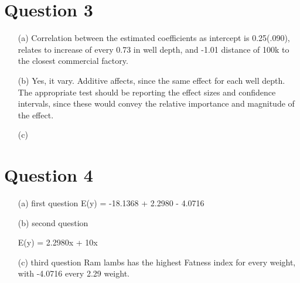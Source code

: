 \documentclass[12pt,letterpaper]{article}
\begin{document}
\section*{Question 3}
\vspace{.5cm}
\begin{enumerate}
	
	\item [(a)] Correlation between the estimated coefficients as intercept is 0.25(.090), relates to increase of every 0.73 in well depth, and -1.01 distance of 100k to the closest commercial factory. 
	
	
	\item [(b)] Yes, it vary. Additive affects, since the same effect for each well depth. The appropriate test should be reporting the effect sizes and confidence intervals, since these would convey the relative importance and magnitude of the effect. 
	
	
	
	\item [(c)] 	  	
	
\end{enumerate}


\section*{Question 4}
\vspace{.5cm}
\begin{enumerate}
	
	\item [(a)] first question 
	E(y) = -18.1368 + 2.2980 - 4.0716	
	
	
	\item [(b)] second question 
	
	E(y) = 2.2980x + 10x  
	
	\item [(c)] third question 
	Ram lambs has the highest Fatness index for every weight, with -4.0716 every 2.29 weight. 
	
\end{enumerate}
\end{document}
